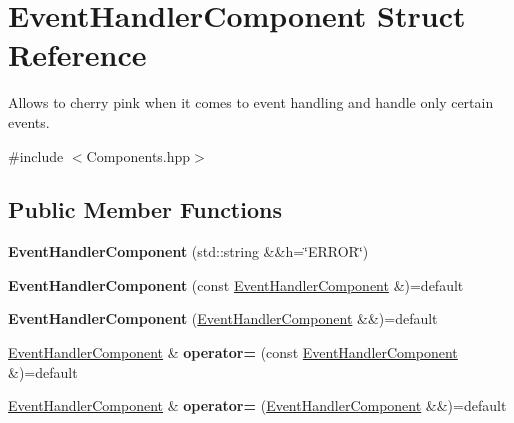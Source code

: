 \hypertarget{struct_event_handler_component}{}\section{Event\+Handler\+Component Struct Reference}
\label{struct_event_handler_component}


Allows to cherry pink when it comes to event handling and handle only certain events.  




{\ttfamily \#include $<$Components.\+hpp$>$}

\subsection*{Public Member Functions}
\begin{DoxyCompactItemize}
\item 
{\bfseries Event\+Handler\+Component} (std\+::string \&\&h=\char`\"{}E\+R\+R\+OR\char`\"{})\hypertarget{struct_event_handler_component_af25948d03abfc06f4715abfcd7ec804e}{}\label{struct_event_handler_component_af25948d03abfc06f4715abfcd7ec804e}

\item 
{\bfseries Event\+Handler\+Component} (const \hyperlink{struct_event_handler_component}{Event\+Handler\+Component} \&)=default\hypertarget{struct_event_handler_component_a88f196bdb6a7f2eea224b4d996f543da}{}\label{struct_event_handler_component_a88f196bdb6a7f2eea224b4d996f543da}

\item 
{\bfseries Event\+Handler\+Component} (\hyperlink{struct_event_handler_component}{Event\+Handler\+Component} \&\&)=default\hypertarget{struct_event_handler_component_ad4fa66de6ade475b42b8d666ebf5aa88}{}\label{struct_event_handler_component_ad4fa66de6ade475b42b8d666ebf5aa88}

\item 
\hyperlink{struct_event_handler_component}{Event\+Handler\+Component} \& {\bfseries operator=} (const \hyperlink{struct_event_handler_component}{Event\+Handler\+Component} \&)=default\hypertarget{struct_event_handler_component_a9545cb998a258abb593d0059a62d4a15}{}\label{struct_event_handler_component_a9545cb998a258abb593d0059a62d4a15}

\item 
\hyperlink{struct_event_handler_component}{Event\+Handler\+Component} \& {\bfseries operator=} (\hyperlink{struct_event_handler_component}{Event\+Handler\+Component} \&\&)=default\hypertarget{struct_event_handler_component_a3bd8413f84d5d4a465df5f3d232739a5}{}\label{struct_event_handler_component_a3bd8413f84d5d4a465df5f3d232739a5}

\end{DoxyCompactItemize}
